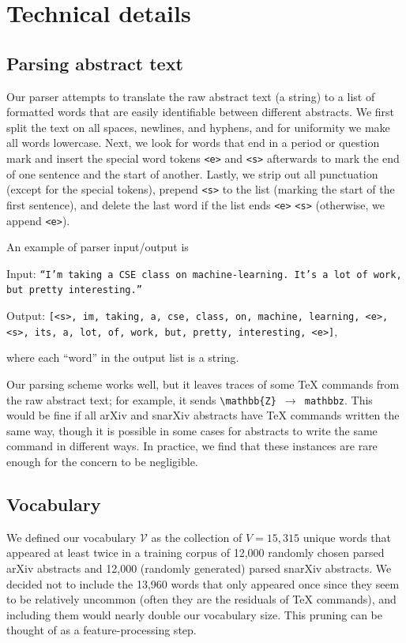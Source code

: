 \documentclass{article}
\newcommand{\V}{\mathcal{V}}
\begin{document}
\appendix
\section{Technical details} \label{app:details}
\subsection{Parsing abstract text}
Our parser attempts to translate the raw abstract text (a string) to a list of formatted words that are easily identifiable between different abstracts.
We first split the text on all spaces, newlines, and hyphens, and for uniformity we make all words lowercase.
Next, we look for words that end in a period or question mark and insert the special word tokens \texttt{<e>} and \texttt{<s>} afterwards to mark the end of one sentence and the start of another.
Lastly, we strip out all punctuation (except for the special tokens), prepend \texttt{<s>} to the list (marking the start of the first sentence), and delete the last word if the list ends \texttt{<e>} \texttt{<s>} (otherwise, we append \texttt{<e>}).

An example of parser input/output is

Input: \texttt{``I'm taking a CSE class on machine-learning.\ It's a lot of work, but pretty interesting.''}

Output: \texttt{[<s>, im, taking, a, cse, class, on, machine, learning, <e>, <s>, its, a, lot, of, work, but, pretty, interesting, <e>]}, 

where each ``word'' in the output list is a string.

Our parsing scheme works well, but it leaves traces of some TeX commands from the raw abstract text; for example, it sends \texttt{\textbackslash mathbb\{Z\} $\to$ mathbbz}.
This would be fine if all arXiv and snarXiv abstracts have TeX commands written the same way, though it is possible in some cases for abstracts to write the same command in different ways. In practice, we find that these instances are rare enough for the concern to be negligible.


\subsection{Vocabulary}
We defined our vocabulary $\V$ as the collection of $V=15,315$ unique words that appeared at least twice in a training corpus of 12,000 randomly chosen parsed arXiv abstracts and 12,000 (randomly generated) parsed snarXiv abstracts.
We decided not to include the 13,960 words that only appeared once since they seem to be relatively uncommon (often they are the residuals of TeX commands), and including them would nearly double our vocabulary size.
This pruning can be thought of as a feature-processing step.
\end{document}
